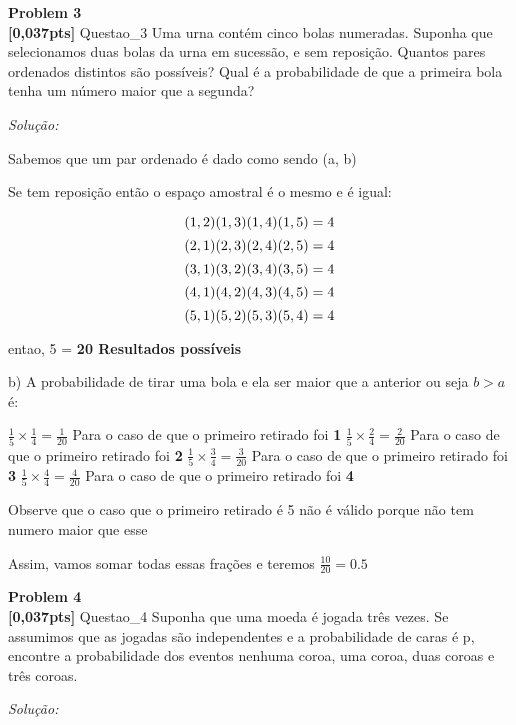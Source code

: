 \documentclass{article}
\newenvironment{problem}[2][Problem]
    { \begin{mdframed}[backgroundcolor=gray!20] \textbf{#1 #2} \\}
    {  \end{mdframed}}
\newenvironment{solution}
    {\textit{Solução:}}
    {}
\begin{document}
\begin{problem}{3}
\textbf{[0,037pts]} Questao\_3 Uma urna contém cinco bolas numeradas. Suponha que selecionamos duas bolas da urna em sucessão, e sem reposição. Quantos pares ordenados distintos são possíveis? Qual é a 
probabilidade de que a primeira bola tenha um número maior que a segunda? 

\end{problem}

\begin{solution}

Sabemos que um par ordenado é dado como sendo (a, b)

Se tem reposição então o espaço amostral é o mesmo e é igual:

\[ (1,2) (1,3) (1,4) (1,5) = 4 \newline \]
\[ (2,1) (2,3) (2,4) (2,5) = 4 \newline \]
\[ (3,1) (3,2) (3,4) (3,5) = 4 \newline \]
\[ (4,1) (4,2) (4,3) (4,5) = 4 \newline \]
\[ (5,1) (5,2) (5,3) (5,4) = 4 \newline \]

entao, 5  = \textbf{20 Resultados possíveis} \newline


b) A probabilidade de tirar uma bola e ela ser maior que a anterior ou seja $b>a$ é: \newline

$\frac{1}{5} \times \frac{1}{4} = \frac{1}{20}$ Para o caso de que o primeiro retirado foi \textbf{1}\newline
$\frac{1}{5} \times \frac{2}{4} = \frac{2}{20}$ Para o caso de que o primeiro retirado foi \textbf{2}\newline
$\frac{1}{5} \times \frac{3}{4} = \frac{3}{20}$ Para o caso de que o primeiro retirado foi \textbf{3}\newline
$\frac{1}{5} \times \frac{4}{4} = \frac{4}{20}$ Para o caso de que o primeiro retirado foi \textbf{4}\newline

Observe que o caso que o primeiro retirado é 5 não é válido porque não tem numero maior que esse\newline

Assim, vamos somar todas essas frações e teremos $\frac{10}{20} = 0.5$
\end{solution}

\begin{problem}{4}
\textbf{[0,037pts]} Questao\_4 Suponha que uma moeda é jogada três vezes. Se assumimos que as jogadas são independentes e a probabilidade de caras é p, encontre a probabilidade dos eventos nenhuma coroa, uma coroa, duas coroas e três coroas. 

\end{problem}

\begin{solution}


\end{solution}
\end{document}
